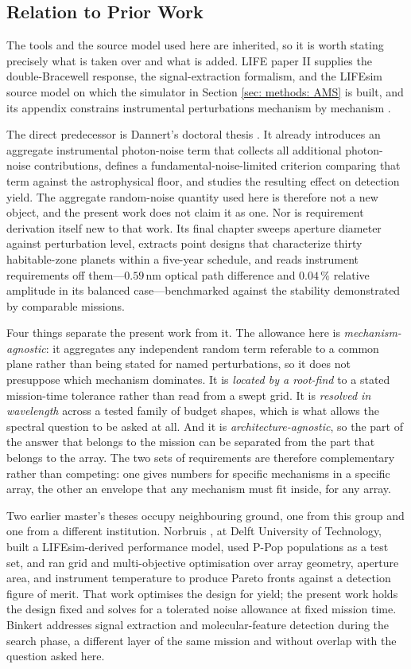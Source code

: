 \documentclass[12pt,a4paper]{article}
\numberwithin{equation}{section}
\numberwithin{figure}{section}
\numberwithin{table}{section}
\begin{document}
\subsection{Relation to Prior Work} \label{sec: intro: prior work}
The tools and the source model used here are inherited, so it is worth stating precisely what is taken over and what is added. LIFE paper II supplies the double-Bracewell response, the signal-extraction formalism, and the LIFEsim source model on which the simulator in Section \ref{sec: methods: AMS} is built, and its appendix constrains instrumental perturbations mechanism by mechanism \cite{dannert2022life2}.

The direct predecessor is Dannert's doctoral thesis \cite{dannert2025thesis}. It already introduces an aggregate instrumental photon-noise term that collects all additional photon-noise contributions, defines a fundamental-noise-limited criterion comparing that term against the astrophysical floor, and studies the resulting effect on detection yield. The aggregate random-noise quantity used here is therefore not a new object, and the present work does not claim it as one. Nor is requirement derivation itself new to that work. Its final chapter sweeps aperture diameter against perturbation level, extracts point designs that characterize thirty habitable-zone planets within a five-year schedule, and reads instrument requirements off them---$0.59$\,nm optical path difference and $0.04\,\%$ relative amplitude in its balanced case---benchmarked against the stability demonstrated by comparable missions.

Four things separate the present work from it. The allowance here is \textit{mechanism-agnostic}: it aggregates any independent random term referable to a common plane rather than being stated for named perturbations, so it does not presuppose which mechanism dominates. It is \textit{located by a root-find} to a stated mission-time tolerance rather than read from a swept grid. It is \textit{resolved in wavelength} across a tested family of budget shapes, which is what allows the spectral question to be asked at all. And it is \textit{architecture-agnostic}, so the part of the answer that belongs to the mission can be separated from the part that belongs to the array. The two sets of requirements are therefore complementary rather than competing: one gives numbers for specific mechanisms in a specific array, the other an envelope that any mechanism must fit inside, for any array.

Two earlier master's theses occupy neighbouring ground, one from this group and one from a different institution. Norbruis \cite{norbruis2023}, at Delft University of Technology, built a LIFEsim-derived performance model, used P-Pop populations as a test set, and ran grid and multi-objective optimisation over array geometry, aperture area, and instrument temperature to produce Pareto fronts against a detection figure of merit. That work optimises the design for yield; the present work holds the design fixed and solves for a tolerated noise allowance at fixed mission time. Binkert \cite{binkert2023} addresses signal extraction and molecular-feature detection during the search phase, a different layer of the same mission and without overlap with the question asked here.
\end{document}
